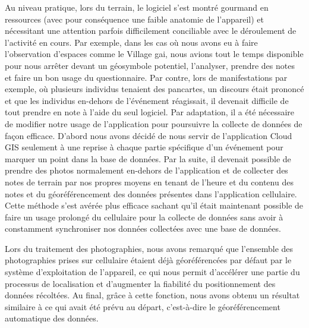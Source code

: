 Au niveau pratique, lors du terrain, le logiciel s'est montré gourmand en ressources (avec pour conséquence une faible anatomie de l'appareil) et nécessitant une attention parfois difficilement conciliable avec le déroulement de l'activité en cours. 
Par exemple, dans les cas où nous avons eu à faire l'observation d'espaces comme le Village gai, nous avions tout le temps disponible pour nous arrêter devant un géosymbole potentiel, l'analyser, prendre des notes et faire un bon usage du questionnaire. 
Par contre, lors de manifestations par exemple, où plusieurs individus tenaient des pancartes, un discours était prononcé et que les individus en-dehors de l'événement réagissait, il devenait difficile de tout prendre en note à l'aide du seul logiciel. 
Par adaptation, il a été nécessaire de modifier notre usage de l'application pour poursuivre la collecte de données de façon efficace. 
D'abord nous avons décidé de nous servir de l'application Cloud GIS seulement à une reprise à chaque partie spécifique d'un événement pour marquer un point dans la base de données. 
Par la suite, il devenait possible de prendre des photos normalement en-dehors de l'application et de collecter des notes de terrain par nos propres moyens en tenant de l'heure et du contenu des notes et du géoréférencement des données présentes dans l'application cellulaire. 
Cette méthode s'est avérée plus efficace sachant qu'il était maintenant possible de faire un usage prolongé du cellulaire pour la collecte de données sans avoir à constamment synchroniser nos données collectées avec une base de données.

Lors du traitement des photographies, nous avons remarqué que l'ensemble des photographies prises sur cellulaire étaient déjà géoréférencées par défaut par le système d'exploitation de l'appareil, ce qui nous permit d'accélérer une partie du processus de localisation et d'augmenter la fiabilité du positionnement des données récoltées. 
Au final, grâce à cette fonction, nous avons obtenu un résultat similaire à ce qui avait été prévu au départ, c'est-à-dire le géoréférencement automatique des données. 

